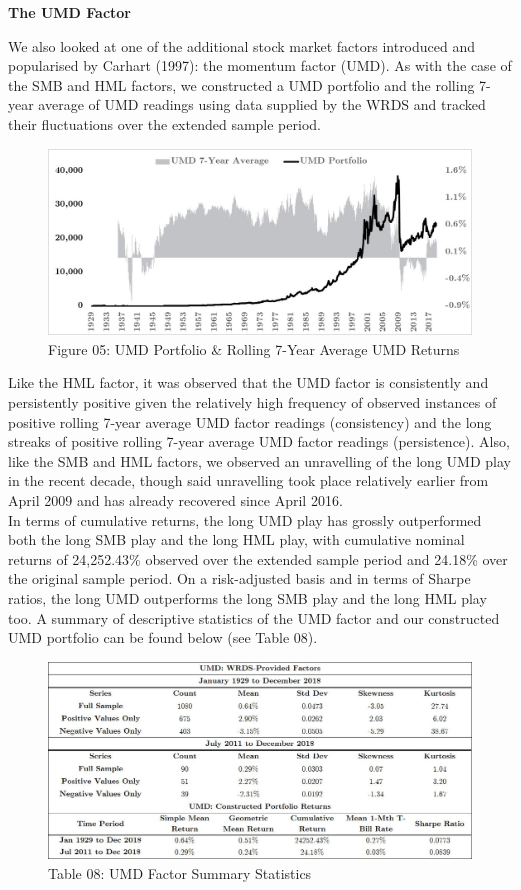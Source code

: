 \documentclass[12pt]{article}
\begin{document}
\noindent \textbf{The UMD Factor}

\noindent We also looked at one of the additional stock market factors introduced and popularised by Carhart (1997): the momentum factor (UMD). As with the case of the SMB and HML factors, we constructed a UMD portfolio and the rolling 7-year average of UMD readings using data supplied by the WRDS and tracked their fluctuations over the extended sample period.

\begin{figure}[h]
	\centering
	\includegraphics[width=0.83\linewidth,trim=4 4 4 4,clip]{UMD01}
	\caption*{Figure 05: UMD Portfolio \& Rolling 7-Year Average UMD Returns}
	\label{fig:label}
\end{figure}

\noindent Like the HML factor, it was observed that the UMD factor is consistently and persistently positive given the relatively high frequency of observed instances of positive rolling 7-year average UMD factor readings (consistency) and the long streaks of positive rolling 7-year average UMD factor readings (persistence). Also, like the SMB and HML factors, we observed an unravelling of the long UMD play in the recent decade, though said unravelling took place relatively earlier from April 2009 and has already recovered since April 2016. \\

\noindent In terms of cumulative returns, the long UMD play has grossly outperformed both the long SMB play and the long HML play, with cumulative nominal returns of 24,252.43\% observed over the extended sample period and 24.18\% over the original sample period. On a risk-adjusted basis and in terms of Sharpe ratios, the long UMD outperforms the long SMB play and the long HML play too. A summary of descriptive statistics of the UMD factor and our constructed UMD portfolio can be found below (see Table 08).

\newpage

\begin{figure}[h]
	\centering
	\includegraphics[width=0.9\linewidth,trim=4 4 4 4,clip]{UMD02}
	\caption*{Table 08: UMD Factor Summary Statistics}
	\label{fig:label}
\end{figure}
\end{document}
